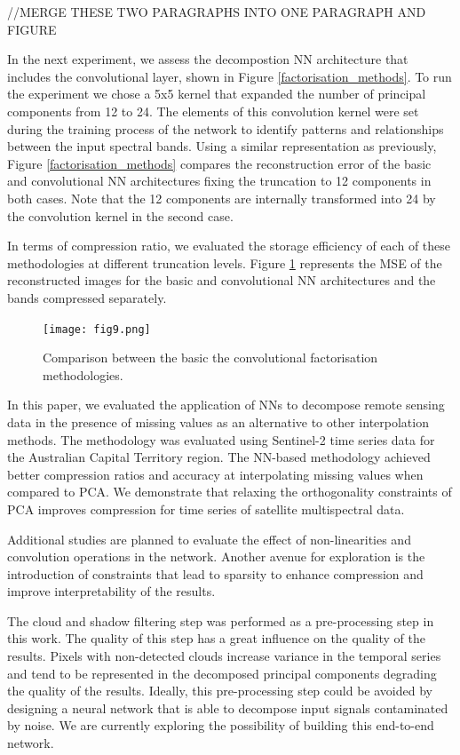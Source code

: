 \documentclass[essd, manuscript]{copernicus}
\begin{document}
//MERGE THESE TWO PARAGRAPHS INTO ONE PARAGRAPH AND FIGURE

In the next experiment, we assess the decompostion NN architecture that includes the convolutional layer, shown in Figure \ref{factorisation_methods}. To run the experiment we chose a 5x5 kernel that expanded the number of principal components from 12 to 24. The elements of this convolution kernel were set during the training process of the network to identify patterns and relationships between the input spectral bands. Using a similar representation as previously, Figure \ref{factorisation_methods} compares the reconstruction error of the basic and convolutional NN architectures fixing the truncation to 12 components in both cases. Note that the 12 components are internally transformed into 24 by the convolution kernel in the second case.


In terms of compression ratio, we evaluated the storage efficiency of each of these methodologies at different truncation levels. Figure \ref{compression_cmp} represents the MSE of the reconstructed images for the basic and convolutional NN architectures and the bands compressed separately. 

\begin{figure}%
    \texttt{[image: fig9.png]}
    \caption{Comparison between the basic the convolutional factorisation methodologies.}%
    \label{compression_cmp}%
\end{figure}


\conclusions  %
In this paper, we evaluated the application of NNs to decompose remote sensing data in the presence of missing values as an alternative to other interpolation methods. The methodology was evaluated using Sentinel-2 time series data for the Australian Capital Territory region. The NN-based methodology achieved better compression ratios and accuracy at interpolating missing values when compared to PCA. We demonstrate that relaxing the orthogonality constraints of PCA improves compression for time series of satellite multispectral data.

Additional studies are planned to evaluate the effect of non-linearities and convolution operations in the network. Another avenue for exploration is the introduction of constraints that lead to sparsity to enhance compression and improve interpretability of the results. 

The cloud and shadow filtering step was performed as a pre-processing step in this work. The quality of this step has a great influence on the quality of the results. Pixels with non-detected clouds increase variance in the temporal series and tend to be represented in the decomposed principal components degrading the quality of the results. Ideally, this pre-processing step could be avoided by designing a neural network that is able to decompose input signals contaminated by noise. We are currently exploring the possibility of building this end-to-end network.
\end{document}
